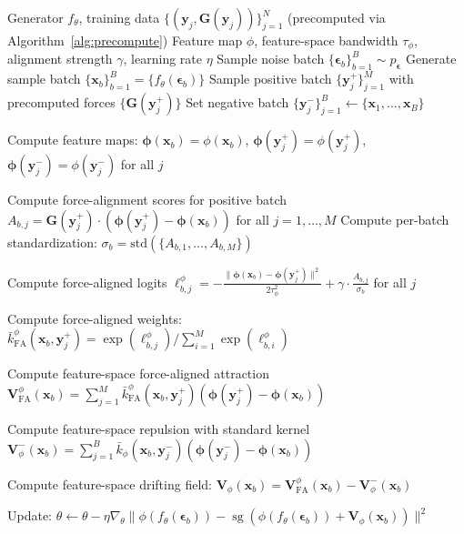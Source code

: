 \documentclass[11pt]{article}
\newcommand{\bx}{\mathbf{x}}
\newcommand{\by}{\mathbf{y}}
\newcommand{\bV}{\mathbf{V}}
\newcommand{\bG}{\mathbf{G}}
\newcommand{\beps}{\boldsymbol{\epsilon}}
\newcommand{\bphi}{\boldsymbol{\phi}}
\newcommand{\kbar}{\bar{k}}
\newcommand{\sg}{\operatorname{sg}}
\begin{document}
\begin{algorithm}[t]
\caption{Feature-Space Force-Aligned Kernel Drifting Training}
\label{alg:feature-force-aligned}
\begin{algorithmic}[1]
\REQUIRE Generator $f_\theta$, training data $\{(\by_j, \bG(\by_j))\}_{j=1}^N$ (precomputed via Algorithm~\ref{alg:precompute})
\REQUIRE Feature map $\phi$, feature-space bandwidth $\tau_\phi$, alignment strength $\gamma$, learning rate $\eta$
    \STATE Sample noise batch $\{\beps_b\}_{b=1}^B \sim p_{\beps}$
    \STATE Generate sample batch $\{\bx_b\}_{b=1}^B = \{f_\theta(\beps_b)\}$  
    \STATE Sample positive batch $\{\by_j^+\}_{j=1}^M$ with precomputed forces $\{\bG(\by_j^+)\}$
    \STATE Set negative batch $\{\by_j^-\}_{j=1}^B \leftarrow \{\bx_1, \ldots, \bx_B\}$ 

        \STATE Compute feature maps: $\bphi(\bx_b) = \phi(\bx_b)$, $\bphi(\by_j^+) = \phi(\by_j^+)$, $\bphi(\by_j^-) = \phi(\by_j^-)$ for all $j$

        \STATE Compute force-alignment scores for positive batch
        \STATE $A_{b,j} = \bG(\by_j^+) \cdot (\bphi(\by_j^+) - \bphi(\bx_b))$ for all $j=1,\ldots,M$
        \STATE Compute per-batch standardization: $\sigma_b = \text{std}(\{A_{b,1},\ldots,A_{b,M}\})$ 

        \STATE Compute force-aligned logits
        \STATE $\ell_{b,j}^\phi = -\frac{\|\bphi(\bx_b) - \bphi(\by_j^+)\|^2}{2\tau_\phi^2} + \gamma \cdot \frac{A_{b,j}}{\sigma_b}$ for all $j$ 

        \STATE Compute force-aligned weights: $\kbar_{\text{FA}}^\phi(\bx_b, \by_j^+) = \exp(\ell_{b,j}^\phi) / \sum_{i=1}^M \exp(\ell_{b,i}^\phi)$

        \STATE Compute feature-space force-aligned attraction
        \STATE $\bV_{\text{FA}}^\phi(\bx_b) = \sum_{j=1}^M \kbar_{\text{FA}}^\phi(\bx_b,\by_j^+) (\bphi(\by_j^+) - \bphi(\bx_b))$ 

        \STATE Compute feature-space repulsion with standard kernel
        \STATE $\bV_\phi^-(\bx_b) = \sum_{j=1}^B \kbar_\phi(\bx_b,\by_j^-) (\bphi(\by_j^-) - \bphi(\bx_b))$

        \STATE Compute feature-space drifting field: $\bV_\phi(\bx_b) = \bV_{\text{FA}}^\phi(\bx_b) - \bV_\phi^-(\bx_b)$

        \STATE Update: $\theta \leftarrow \theta - \eta\nabla_\theta \|\phi(f_\theta(\beps_b)) - \sg(\phi(f_\theta(\beps_b)) + \bV_\phi(\bx_b))\|^2$ 
    \ENDFOR
\ENDWHILE
\end{algorithmic}
\end{algorithm}
\end{document}
